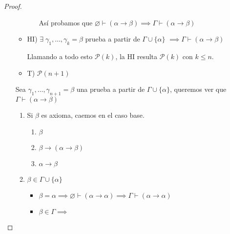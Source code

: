 \begin{proof}
\begin{itemize}
\begin{itemize}
\begin{enumerate}
                        Así probamos que 
                        $\varnothing\vdash(\alpha\to\beta)
                        \implies \Gamma \vdash (\alpha\to\beta)$

                    \end{enumerate}

                \item HI) $\exists \; \gamma_1, \dotsc, \gamma_k = \beta$ 
                    prueba a partir de $\Gamma \cup \{ \alpha \}$
                    $\implies \Gamma \vdash (\alpha\to\beta)$

                    Llamando a todo esto $\mathcal{P}(k)$, la HI resulta
                    $\mathcal{P}(k)$ con $k \leq n$.

                \item T) $\mathcal{P}(n+1)$
            \end{itemize}


            Sea $\gamma_1, \dotsc, \gamma_{n+1} = \beta$ una prueba a partir
            de $\Gamma \cup \{ \alpha \}$, queremos ver que
            $\Gamma \vdash (\alpha \to \beta)$

            \begin{enumerate}[%
                            labelindent=*,
                            style=multiline,
                            leftmargin=*,
                            align=left,
                            leftmargin=2\parindent,
                            label=Caso \arabic*)]
                \item Si $\beta$ es axioma, caemos en el caso base.

                    \begin{enumerate}
                        \item $\beta$ %
                        \item $\beta\to(\alpha\to\beta)$ %
                        \item $\alpha \to \beta$
                    \end{enumerate}

                \item $\beta \in \Gamma \cup \{\alpha\}$
                    \begin{itemize}
                        \item $\beta=\alpha 
                            \implies \varnothing\vdash(\alpha\to\alpha)
                            \implies \Gamma\vdash(\alpha\to\alpha)$
                        \item $\beta \in \Gamma \implies$ 


\end{itemize}
\end{enumerate}
\end{itemize}
\end{proof}
